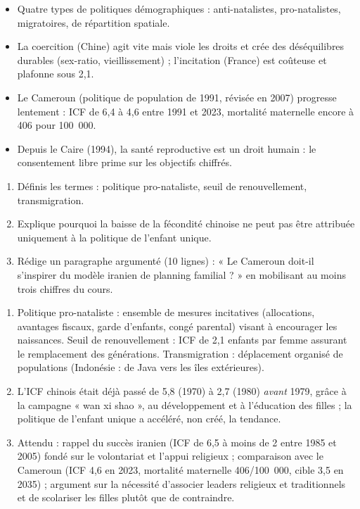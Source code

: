 \documentclass[11pt]{article}
\begin{document}
\begin{aretenir}
\begin{itemize}
\item Quatre types de politiques démographiques : anti-natalistes, pro-natalistes, migratoires, de répartition spatiale.
\item La coercition (Chine) agit vite mais viole les droits et crée des déséquilibres durables (sex-ratio, vieillissement) ; l'incitation (France) est coûteuse et plafonne sous 2,1.
\item Le Cameroun (politique de population de 1991, révisée en 2007) progresse lentement : ICF de 6,4 à 4,6 entre 1991 et 2023, mortalité maternelle encore à 406 pour 100~000.
\item Depuis le Caire (1994), la santé reproductive est un droit humain : le consentement libre prime sur les objectifs chiffrés.
\end{itemize}
\end{aretenir}

\begin{exercice}
\begin{enumerate}
\item Définis les termes : politique pro-nataliste, seuil de renouvellement, transmigration.
\item Explique pourquoi la baisse de la fécondité chinoise ne peut pas être attribuée uniquement à la politique de l'enfant unique.
\item Rédige un paragraphe argumenté (10 lignes) : « Le Cameroun doit-il s'inspirer du modèle iranien de planning familial ? » en mobilisant au moins trois chiffres du cours.
\end{enumerate}
\end{exercice}

\begin{corrige}[Exercice 1]
\begin{enumerate}
\item Politique pro-nataliste : ensemble de mesures incitatives (allocations, avantages fiscaux, garde d'enfants, congé parental) visant à encourager les naissances. Seuil de renouvellement : ICF de 2,1 enfants par femme assurant le remplacement des générations. Transmigration : déplacement organisé de populations (Indonésie : de Java vers les îles extérieures).
\item L'ICF chinois était déjà passé de 5,8 (1970) à 2,7 (1980) \emph{avant} 1979, grâce à la campagne « wan xi shao », au développement et à l'éducation des filles ; la politique de l'enfant unique a accéléré, non créé, la tendance.
\item Attendu : rappel du succès iranien (ICF de 6,5 à moins de 2 entre 1985 et 2005) fondé sur le volontariat et l'appui religieux ; comparaison avec le Cameroun (ICF 4,6 en 2023, mortalité maternelle 406/100~000, cible 3,5 en 2035) ; argument sur la nécessité d'associer leaders religieux et traditionnels et de scolariser les filles plutôt que de contraindre.
\end{enumerate}
\end{corrige}
\end{document}
